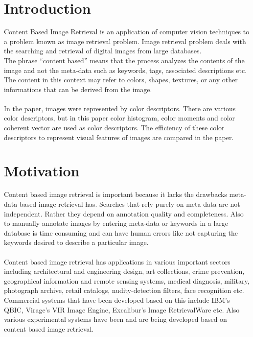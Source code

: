 \documentclass{report}
\begin{document}
\section{Introduction}

Content Based Image Retrieval  is an application of computer vision 
techniques to a problem known as image retrieval problem. Image retrieval 
problem deals with the searching and retrieval of digital images from 
large databases.\\
\newline
The phrase “content based” means that the process analyzes the contents 
of the image and not the meta-data such as keywords, tags, associated 
descriptions etc. The content in this context may refer to colors, 
shapes, textures, or any other informations that can be derived from the image.\\
\\
In the paper, images were represented by color descriptors. There are 
various color descriptors, but in this paper color histogram, color 
moments and color coherent vector are used as color descriptors. The 
efficiency of these color descriptors to represent visual features of 
images are compared in the paper. 

\section{Motivation}
Content based image retrieval is important because it lacks the drawbacks meta-data based image retrieval has. Searches that rely purely on meta-data are not independent. Rather they depend on annotation quality and completeness. Also to manually annotate images by entering meta-data  or keywords in a large database is time consuming and can have human errors like not capturing the keywords desired to describe a particular image.\\
\\
Content based image retrieval has applications in various important sectors including architectural and engineering design, art collections, crime prevention, geographical information and remote sensing systems, medical diagnosis, military, photograph archive, retail catalogs, nudity-detection filters, face recognition etc. Commercial systems that have been developed based on this include IBM’s QBIC, Virage’s VIR Image Engine, Excalibur’s Image RetrievalWare etc. Also various experimental systems have been and are being developed based on content based image retrieval.
\end{document}
